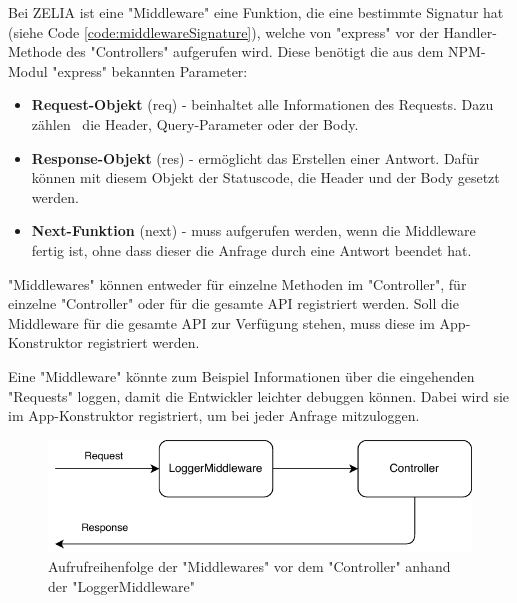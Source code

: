 \label{sec:middleware}

Bei ZELIA ist eine "Middleware" eine Funktion, die eine bestimmte Signatur hat (siehe Code \ref{code:middlewareSignature}), welche von "express" vor der Handler-Methode des "Controllers" aufgerufen wird. 
Diese benötigt die aus dem NPM-Modul "express" bekannten Parameter:

\begin{itemize}
    \item \textbf{Request-Objekt} ({\ttfamily req}) - beinhaltet alle Informationen des Requests. Dazu zählen \zb\ die Header, Query-Parameter oder der Body.
    \item \textbf{Response-Objekt} ({\ttfamily res}) - ermöglicht das Erstellen einer Antwort. Dafür können mit diesem Objekt der Statuscode, die Header und der Body gesetzt werden.
    \item \textbf{Next-Funktion} ({\ttfamily next}) - muss aufgerufen werden, wenn die Middleware fertig ist, ohne dass dieser die Anfrage durch eine Antwort beendet hat.
\end{itemize}

"Middlewares" können entweder für einzelne Methoden im "Controller", für einzelne "Controller" oder für die gesamte API registriert werden. Soll die Middleware für die gesamte API zur Verfügung stehen, muss diese im App-Konstruktor registriert werden.



Eine "Middleware" könnte zum Beispiel Informationen über die eingehenden "Requests" loggen, damit die Entwickler leichter debuggen können. 
Dabei wird sie im \linebreak App-Konstruktor registriert, um bei jeder Anfrage mitzuloggen. 

\begin{figure}[H]
    \centering
    \includegraphics{media/APITemplate/LogMiddleware.svg.pdf}
    \caption{Aufrufreihenfolge der "Middlewares" vor dem "Controller" anhand der "LoggerMiddleware"} 
\end{figure}

